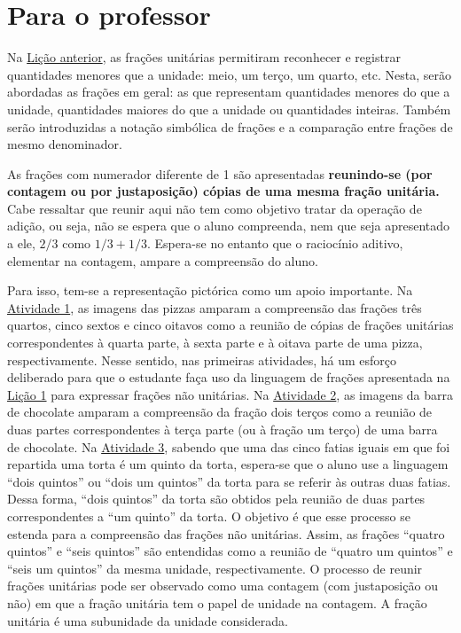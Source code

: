 
\chapter{Para o professor}\label{chap2}

Na \hyperref[chap1]{Lição anterior}, as frações unitárias permitiram reconhecer e registrar quantidades menores que a unidade: meio, um terço, um quarto, etc. Nesta, serão abordadas as frações em geral: as que representam quantidades menores do que a unidade, quantidades maiores do que a unidade ou quantidades inteiras. Também serão introduzidas a notação simbólica de frações e a comparação entre frações de mesmo denominador. 

As frações com numerador diferente de 1 são apresentadas \textbf{reunindo-se (por contagem ou por justaposição) cópias de uma mesma fração unitária.}
Cabe ressaltar que reunir aqui não tem como objetivo tratar da operação de adição, ou seja, não se espera que o aluno compreenda, nem que seja apresentado a ele, $2/3$ como $1/3 + 1/3$. Espera-se no entanto que o raciocínio aditivo, elementar na contagem, ampare a compreensão do aluno.

Para isso, tem-se a representação pictórica como um apoio importante.
Na \hyperref[chap2-ativ2]{Atividade 1}, as imagens das pizzas amparam a compreensão das frações três quartos, cinco sextos e cinco oitavos como a reunião de cópias de frações unitárias correspondentes à quarta parte, à sexta parte e à oitava parte de uma pizza, respectivamente. Nesse sentido, nas primeiras atividades, há um esforço deliberado para que o estudante faça uso da linguagem de frações apresentada na \hyperref[chap1]{Lição 1} para expressar frações não unitárias.
Na \hyperref[chap2-ativ2]{Atividade 2}, as imagens da barra de chocolate amparam a compreensão da fração dois terços como a reunião de duas partes correspondentes à terça parte (ou à fração um terço) de uma barra de chocolate.
Na \hyperref[chap2-ativ3]{Atividade 3}, sabendo que uma das cinco fatias iguais em que foi repartida uma torta é um quinto da torta, espera-se que o aluno use a linguagem ``dois quintos'' ou ``dois um quintos'' da torta para se referir às outras duas fatias.
Dessa forma, ``dois quintos'' da torta são obtidos pela reunião de duas partes correspondentes a ``um quinto'' da torta.
O objetivo é que esse processo se estenda para a compreensão das frações não unitárias.
Assim, as frações ``quatro quintos'' e ``seis quintos'' são entendidas como a reunião de ``quatro um quintos'' e ``seis um quintos'' da mesma unidade, respectivamente. O processo de reunir frações unitárias pode ser observado como uma contagem (com justaposição ou não) em que a fração unitária tem o papel de unidade na contagem. A fração unitária é uma subunidade da unidade considerada. 

